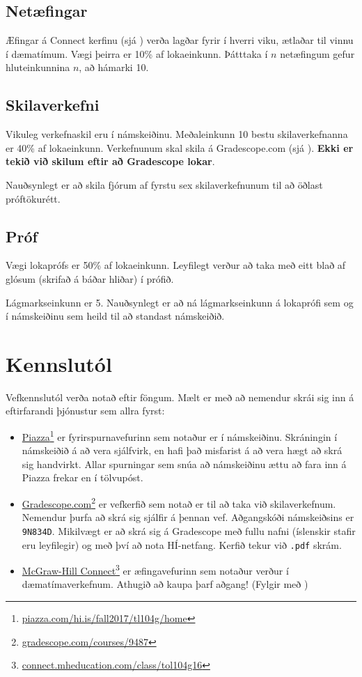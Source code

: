 \documentclass[justified, nobib]{tufte-handout}
\begin{document}
\subsection{Netæfingar}
Æfingar á Connect kerfinu (sjá ) verða lagðar fyrir í hverri viku, ætlaðar til vinnu í dæmatímum. Vægi þeirra er 10\% af lokaeinkunn. Þátttaka í $n$ netæfingum gefur hluteinkunnina $n$, að hámarki 10.

\subsection{Skilaverkefni}
Vikuleg verkefnaskil eru í námskeiðinu. Meðaleinkunn 10 bestu skilaverkefnanna er 40\% af lokaeinkunn. Verkefnunum skal skila á Gradescope.com (sjá ). \textbf{Ekki er tekið við skilum eftir að Gradescope lokar}.

Nauðsynlegt er að skila fjórum af fyrstu sex skilaverkefnunum til að öðlast próftökurétt.
\subsection{Próf}
Vægi lokaprófs er 50\% af lokaeinkunn. Leyfilegt verður að taka með eitt blað af glósum (skrifað á báðar hliðar) í prófið.

Lágmarkseinkunn er 5. Nauðsynlegt er að ná lágmarkseinkunn á lokaprófi sem og í námskeiðinu sem heild til að standast námskeiðið. 

\section{Kennslutól}
\label{sec:tools}
Vefkennslutól verða notað eftir föngum. Mælt er með að nemendur skrái sig inn á eftirfarandi þjónustur sem allra fyrst:
\begin{itemize}
 \item \href{piazza.com/hi.is/fall2017/tl104g/home}{Piazza}\footnote{\url{piazza.com/hi.is/fall2017/tl104g/home}} er fyrirspurnavefurinn sem notaður er í námskeiðinu. Skráningin í námskeiðið á að vera sjálfvirk, en hafi það misfarist á að vera hægt að skrá sig handvirkt. Allar spurningar sem snúa að námskeiðinu ættu að fara inn á Piazza frekar en í tölvupóst.
 \item \href{https://gradescope.com/courses/9487}{Gradescope.com}\footnote{\url{gradescope.com/courses/9487}} er vefkerfið sem notað er til að taka við skilaverkefnum. Nemendur þurfa að skrá sig sjálfir á þennan vef. Aðgangskóði námskeiðsins er \texttt{9N834D}. Mikilvægt er að skrá sig á Gradescope með fullu nafni (íslenskir stafir eru leyfilegir) og með því að nota HÍ-netfang. Kerfið tekur við \texttt{.pdf} skrám.
 \item \href{http://connect.mheducation.com/class/tol104g16}{McGraw-Hill Connect}\footnote{\url{connect.mheducation.com/class/tol104g16}} er æfingavefurinn sem notaður verður í dæmatímaverkefnum. Athugið að kaupa þarf aðgang! (Fylgir með ) %
\end{itemize}
\end{document}
